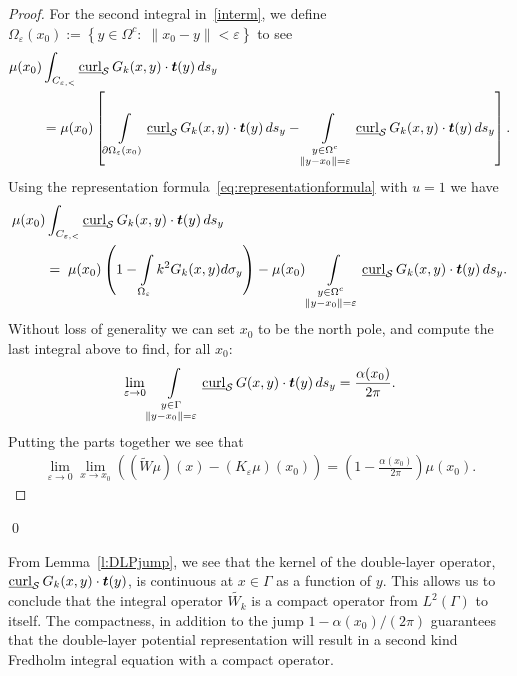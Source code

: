 \begin{proof}
For the second integral in~\eqref{interm}, we define
$\Omega_{\varepsilon}(x_{0}):=\left\{ y\in\Omega^{c}:\; \|x_0-y\|<
\varepsilon \right\}$ to see
\begin{align*}
  \mu(x_0)&\int_{C_{\e,<}} \underline{\mbox{curl}}_{\S}\,
    G_k(x,y)\cdot\vec{t}(y)\,ds_{y} \\
  &= \mu(x_0) \left[ \int\limits_{\partial \Omega_{\varepsilon}(x_0)} 
  \underline{\mbox{curl}}_{\S}\,G_k(x,y)\cdot\vec{t}(y)\,ds_{y} - 
  \int\limits_{\substack{y \in \Omega^{c} \\ \|y - x_{0}\| =
  \varepsilon}}
\underline{\mbox{curl}}_{\S}\,G_k(x,y)\cdot\vec{t}(y)\,ds_{y} \right].
\end{align*}
Using the representation formula~\eqref{eq:representationformula} with
$u=1$ we have
\begin{align*}
  \mu(x_0)&\int_{C_{\e,<}} \underline{\mbox{curl}}_{\S}\,
    G_k(x,y)\cdot\vec{t}(y)\,ds_{y} \\
    &=\;\mu(x_0) \left(1 - \int\limits_{\Omega_{\varepsilon}} 
    k^2 G_k(x,y) d\sigma_{y}\right) 
   - \mu(x_0) \int\limits_{\substack{y \in \Omega^{c} \\ \|y - x_{0}\| =
  \varepsilon}}
\underline{\mbox{curl}}_{\S}\,G_k(x,y)\cdot\vec{t}(y)\,ds_{y}.
\end{align*}
Without loss of generality we can set $x_0$ to be the north pole, and
compute the last integral above  to find, for all $x_{0}$: 
\begin{align*}
  \lim_{\varepsilon\rightarrow 0}
  \int\limits_{\substack{y \in \Gamma \\ \|y - x_{0}\| = \varepsilon}}
  \underline{\mbox{curl}}_{\S}\,G(x,y)\cdot\vec{t}(y)\,ds_{y}
  =\frac{\alpha(x_0)}{2\pi}.
\end{align*}
Putting the parts together we see that
\begin{align*}
  \lim_{\varepsilon\rightarrow 0} \lim_{x\rightarrow x_0}
  \left((\widetilde{W}\mu)(x)-(K_{\varepsilon}\mu)(x_0)\right)
  =\left(1-\frac{\alpha(x_0)}{2\pi}\right)\mu(x_0).
\end{align*}
\end{proof}
\qed

From Lemma~\ref{l:DLPjump}, we see that the kernel of the double-layer
operator, $\underline{\mbox{curl}}_{\S}\, G_{k}(x,y)\cdot\vec{t}(y)$,
is continuous at $x \in \Gamma$ as a function of $y$.  This allows us
to conclude that the integral operator $\widetilde{W_k}$ is a compact
operator from $L^{2}(\Gamma)$ to itself.  The compactness, in addition
to the jump $1-\alpha(x_0)/(2\pi)$ guarantees that the double-layer
potential representation will result in a second kind Fredholm integral
equation with a compact operator.

